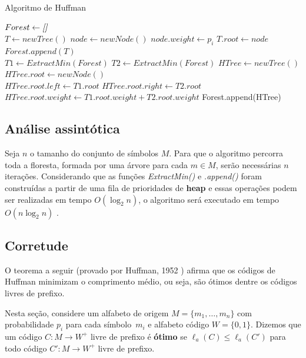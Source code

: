 \begin{algorithm}[H]
\caption{Algoritmo de Huffman} \label{alg:huff}
\begin{algorithmic}
	\State $Forest \gets \emph{[]}$\\
	 
		\State $T \gets newTree()$
		\State $node \gets newNode()$
		\State $node.weight \gets p_i$ 
		\State $T.root \gets node$
		\State $Forest.append(T)$ 
	\EndFor \\
	
		\State $T1 \gets ExtractMin(Forest)$ 
		\State $T2 \gets ExtractMin(Forest)$
		\State $HTree \gets newTree()$
		\State $HTree.root \gets newNode()$ \\
		\State $HTree.root.left \gets T1.root$
		\State $HTree.root.right \gets T2.root$
		\State $HTree.root.weight \gets T1.root.weight + T2.root.weight$
		\State Forest.append(HTree) 
	\EndWhile
\end{algorithmic}
\end{algorithm}

\subsection{Análise assintótica}

Seja $n$ o tamanho do conjunto de símbolos $M$. Para que o algoritmo percorra toda a floresta, formada por uma árvore para cada $m \in M$, serão necessárias $n$ iterações. Considerando que as funções \emph{ExtractMin()} e \emph{.append()} foram construídas a partir de uma fila de prioridades de \textbf{heap} e essas operações podem ser realizadas em tempo $O(\log_2 n)$, o algoritmo será executado em tempo $O(n\log_2 n)$ \cite{Ble}.

\subsection{Corretude}
O teorema a seguir (provado por Huffman, 1952 \cite{Huff}) afirma
que os códigos de Huffman minimizam o comprimento médio, ou seja, são
ótimos dentre os códigos livres de prefixo.

Nesta seção, considere um alfabeto de origem $M = \{m_1,\dotsc, m_n\}$
com probabilidade $p_i$ para cada símbolo~$m_i$ e alfabeto código $W =
\{0,1\}$. Dizemos que um código $C: M\to W^+$ livre de prefixo é
\textbf{ótimo} se $\ell_a(C) \leq \ell_a(C')$ para todo código $C': M\to
W^+$ livre de prefixo.

